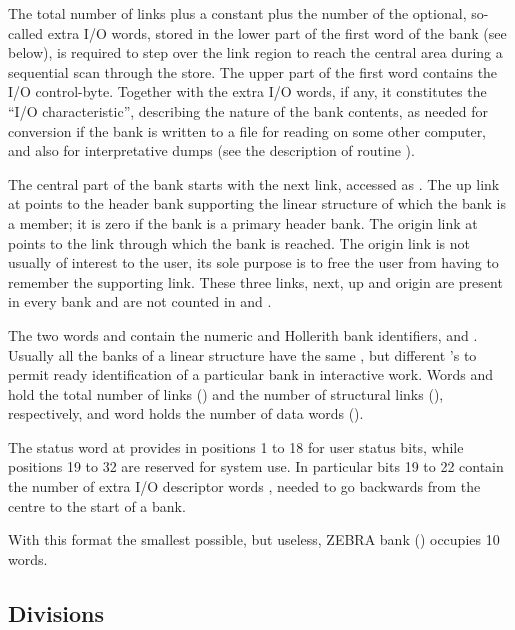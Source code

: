 The total number of links  plus a constant plus the number of the
optional, so-called extra I/O words, stored
in the lower part of the first word of the bank (see below),
is required to step over the link
region to reach the central area during a sequential scan
through the store.
The upper part of the first word contains the I/O control-byte.
Together with the extra I/O words, if any, it constitutes the
``I/O characteristic'', describing the nature of the bank contents,
as needed for conversion if the bank is written to a file for reading
on some other computer, and also for interpretative dumps
(see the description of routine ).

The central part of the bank starts with the next link,
accessed as .
The up link at  points to the header bank supporting
the linear structure of which the bank is a member;
it is zero if the bank is a primary header bank.
The origin link at  points to the link
through which the bank is reached.
The origin link is not usually of interest to the user,
its sole purpose is to free the user from having to remember the
supporting link. These three links, next, up and origin are present
in every bank and are not counted in  and .

The two words  and  contain the numeric and Hollerith bank
identifiers,  and . 
Usually all the banks of a linear structure
have the same , but different 's to permit ready
identification of a particular bank in interactive work.
Words  and 
hold the total number of links () and the number of structural
links (), respectively,
and word  holds the number of data words ().

The status word at  provides in positions
1 to 18 for user status bits,
while positions 19 to 32 are reserved for system use. In particular
bits 19 to 22 contain the number of extra I/O descriptor words ,
needed to go backwards from the centre to the start of a bank.

With this format the smallest possible, but useless, ZEBRA
bank () occupies 10 words.

\subsection{Divisions}

